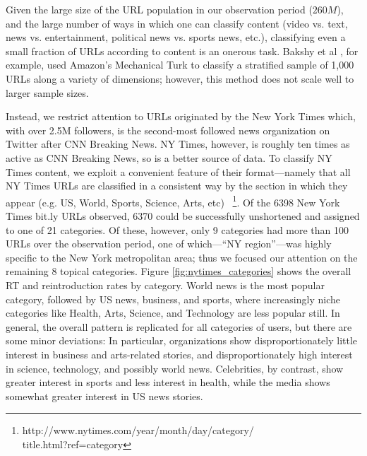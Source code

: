 \documentclass[phd,tocprelim]{cornell}
\begin{document}
Given the large size of the URL population in our observation period
($260M$), and the large number of ways in which one can classify content
(video vs. text, news vs. entertainment, political news vs. sports news,
etc.), classifying even a small fraction of URLs according to content is an
onerous task. Bakshy et al \cite{Bakshy-2011}, for example, used Amazon's
Mechanical Turk to classify a stratified sample of 1,000 URLs along a
variety of dimensions; however, this method does not scale well to larger
sample sizes.

Instead, we restrict attention to URLs originated by the New York Times
which, with over 2.5M followers, is the second-most followed news
organization on Twitter after CNN Breaking News. NY Times, however, is
roughly ten times as active as CNN Breaking News, so is a better source of
data. To classify NY Times content, we exploit a convenient feature of
their format---namely that all NY Times URLs are classified in a consistent
way by the section in which they appear (e.g. US, World, Sports, Science,
Arts, etc)
~\footnote{http://www.nytimes.com/year/month/day/category/\\title.html?ref=category}.
Of the 6398 New York Times bit.ly URLs observed, 6370 could be successfully
unshortened and assigned to one of 21 categories. Of these, however, only 9
categories had more than 100 URLs over the observation period, one of
which---``NY region''---was highly specific to the New York metropolitan
area; thus we focused our attention on the remaining 8 topical categories.
Figure \ref{fig:nytimes_categories} shows the overall RT and reintroduction
rates by category. World news is the most popular category, followed by US
news, business, and sports, where increasingly niche categories like
Health, Arts, Science, and Technology are less popular still.  In general,
the overall pattern is replicated for all categories of users, but there
are some minor deviations: In particular, organizations show
disproportionately little interest in business and arts-related stories,
and disproportionately high interest in science, technology, and possibly
world news. Celebrities, by contrast, show greater interest in sports and
less interest in health, while the media shows somewhat greater interest in
US news stories.

\end{document}

